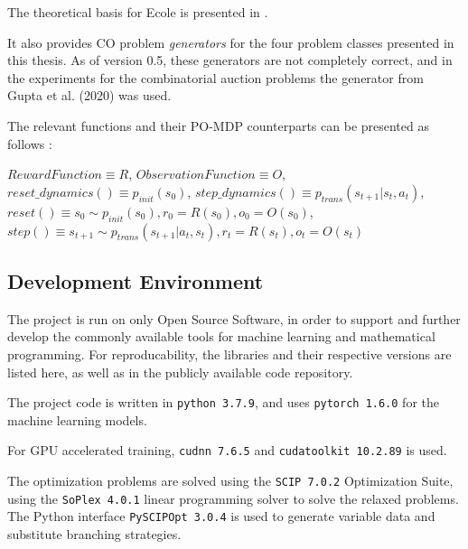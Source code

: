 The theoretical basis for \gls{Ecole} is presented in . 

It also provides \gls{CO} problem \textit{generators} for the four problem classes presented in this thesis. As of version 0.5, these generators are not completely correct, and in the experiments for the combinatorial auction problems the generator from Gupta et al. (2020) \cite{gupta2020hybrid} was used. 

The relevant functions and their \gls{PO-MDP} counterparts can be presented as follows \cite{prouvost2020ecole}:

$RewardFunction \equiv R$, 
$ObservationFunction \equiv O$, 
$reset\_dynamics() \equiv p_\textit{init}(s_0)$, 
$step\_dynamics() \equiv p_\textit{trans}(s_{t+1}|s_t,a_t)$, 
$reset() \equiv s_0 \sim p_\textit{init}(s_0), r_0=R(s_0), o_0=O(s_0)$, 
$step() \equiv s_{t+1} \sim p_\textit{trans}(s_{t+1}|a_t,s_t), r_t=R(s_t), o_t=O(s_t)$




\subsection{Development Environment}

The project is run on only Open Source Software, in order to support and further develop the commonly available tools for machine learning and mathematical programming. For reproducability, the libraries and their respective versions are listed here, as well as in the publicly available code repository. 

The project code is written in 
\verb|python 3.7.9|, and uses               
\verb|pytorch 1.6.0| for the machine learning models.           

For \gls{GPU} accelerated training, 
\verb|cudnn 7.6.5| and 
\verb|cudatoolkit 10.2.89| is used. 

The optimization problems are solved using the \verb|SCIP 7.0.2| Optimization Suite, using the 
\verb|SoPlex 4.0.1| linear programming solver to solve the relaxed problems. The Python interface
\verb|PySCIPOpt 3.0.4| is used to generate variable data and substitute branching strategies.
